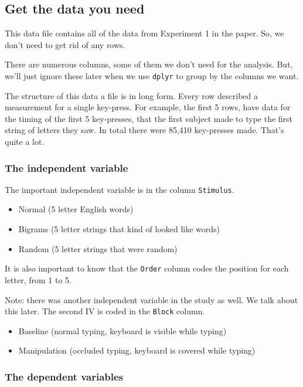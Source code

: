 \documentclass[]{book}
\providecommand{\tightlist}{%
  \setlength{\itemsep}{0pt}\setlength{\parskip}{0pt}}
\theoremstyle{definition}
\theoremstyle{definition}
\theoremstyle{definition}
\theoremstyle{remark}
\begin{document}
\subsection{Get the data you need}\label{get-the-data-you-need-1}

This data file contains all of the data from Experiment 1 in the paper.
So, we don't need to get rid of any rows.

There are numerous columns, some of them we don't need for the analysis.
But, we'll just ignore these later when we use \texttt{dplyr} to group
by the columns we want.

The structure of this data a file is in long form. Every row described a
measurement for a single key-press. For example, the first 5 rows, have
data for the timing of the first 5 key-presses, that the first subject
made to type the first string of letters they saw. In total there were
85,410 key-presses made. That's quite a lot.

\subsubsection{The independent
variable}\label{the-independent-variable-1}

The important independent variable is in the column \texttt{Stimulus}.

\begin{itemize}
\tightlist
\item
  Normal (5 letter English words)
\item
  Bigrams (5 letter strings that kind of looked like words)
\item
  Random (5 letter strings that were random)
\end{itemize}

It is also important to know that the \texttt{Order} column codes the
position for each letter, from 1 to 5.

Note: there was another independent variable in the study as well. We
talk about this later. The second IV is coded in the \texttt{Block}
column.

\begin{itemize}
\tightlist
\item
  Baseline (normal typing, keyboard is visible while typing)
\item
  Manipulation (occluded typing, keyboard is covered while typing)
\end{itemize}

\subsubsection{The dependent variables}\label{the-dependent-variables}
\end{document}
